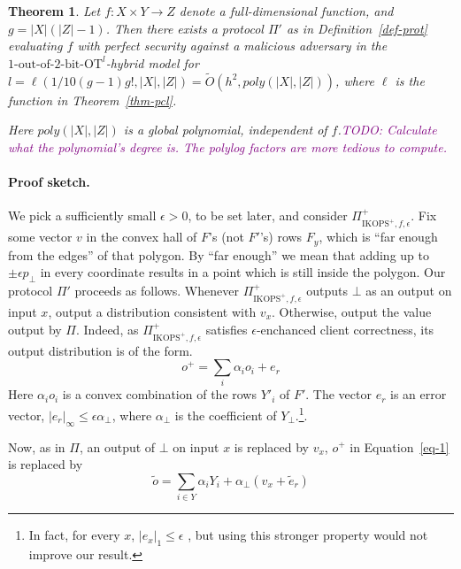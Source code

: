\documentclass[a4paper]{article}
\newtheorem{theorem}{Theorem}[section]
\newcommand{\OT}[2]{#1\text{-out-of-}#2\text{-bit-OT}}
\newcommand{\atodo}[1]{\textcolor{purple}{TODO: #1}}
\begin{document}
\begin{theorem}\label{thm-main}
Let $f:X\times Y\rightarrow Z$ denote a full-dimensional function, and
$g=|X|(|Z|-1)$.
Then there exists a protocol $\Pi'$ as in Definition~\ref{def-prot} evaluating $f$ with perfect security against a malicious adversary in the ${\OT{1}{2}}^l$-hybrid model
for $l=\ell(1/10(g-1)g!, |X|, |Z|)=\tilde{O}(h^2,poly(|X|,|Z|))$, where $\ell$ is the function in Theorem~\ref{thm-pcl}.
 

Here $poly(|X|,|Z|)$ is a global polynomial, independent of $f$.\atodo{Calculate what the polynomial's degree is. The polylog factors are more tedious to compute.}

\end{theorem}

\paragraph{Proof sketch.}

We pick a sufficiently small $\epsilon>0$, to be set later, and consider $\Pi^+_{\text{IKOPS}^+,f,\epsilon}$. Fix some vector $v$ in the convex hall of $F$'s (not $F'$'s) rows $F_y$, which is ``far enough from the edges'' of that polygon.
By ``far enough'' we mean that adding up to $\pm\epsilon p_\bot$ in every coordinate
results in a point which is still inside the polygon.
Our protocol $\Pi'$ proceeds as follows. Whenever $\Pi^+_{\text{IKOPS}^+,f,\epsilon}$ outputs $\bot$ as an output on input $x$, output  a distribution consistent with $v_x$. Otherwise, output the value output by $\Pi$. 
Indeed, as $\Pi^+_{\text{IKOPS}^+,f,\epsilon}$ satisfies $\epsilon$-enchanced client correctness, its output distribution 
is of the form.
\begin{equation}\label{eq-1}
o^+ = \sum_i\alpha_i o_i + e_r
\end{equation}
Here $\alpha_i o_i$ is a convex combination of the rows $Y'_i$ of $F'$.
The vector $e_r$ is an error vector, $|e_r|_\infty\leq \epsilon\alpha_\bot$, where $\alpha_\bot$ is the coefficient of $Y_\bot$.\footnote{In fact, for every $x$, $|e_x|_1\leq \epsilon$ , but using this stronger property would not improve our result.}.

Now, as in $\Pi$, an output of $\bot$ on input $x$ is replaced by $v_x$,
$o^+$ in Equation~\ref{eq-1} is replaced by
\begin{equation}
\tilde{o} = \sum_{i\in Y}\alpha_i Y_i + \alpha_\bot (v_x+\tilde{e}_r)
\end{equation}
\end{document}
